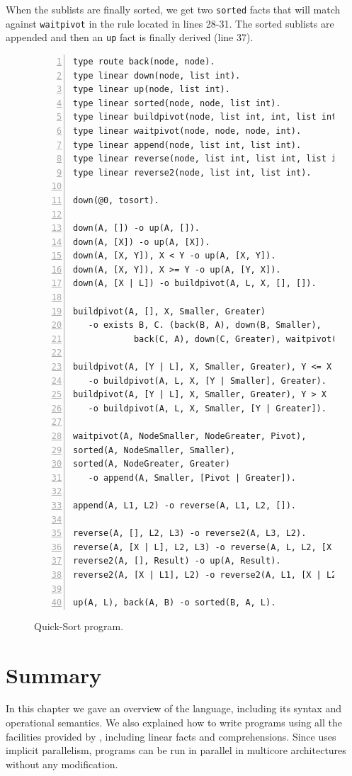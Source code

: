 When the sublists are finally sorted, we get two \texttt{sorted} facts that will match
against \texttt{waitpivot} in the rule located in lines 28-31. The sorted sublists
are appended and then an \texttt{up} fact is finally derived (line 37).

\begin{figure}[h!]
\small\begin{Verbatim}[numbers=left]
type route back(node, node).
type linear down(node, list int).
type linear up(node, list int).
type linear sorted(node, node, list int).
type linear buildpivot(node, list int, int, list int, list int).
type linear waitpivot(node, node, node, int).
type linear append(node, list int, list int).
type linear reverse(node, list int, list int, list int).
type linear reverse2(node, list int, list int).

down(@0, tosort).

down(A, []) -o up(A, []).
down(A, [X]) -o up(A, [X]).
down(A, [X, Y]), X < Y -o up(A, [X, Y]).
down(A, [X, Y]), X >= Y -o up(A, [Y, X]).
down(A, [X | L]) -o buildpivot(A, L, X, [], []).

buildpivot(A, [], X, Smaller, Greater)
   -o exists B, C. (back(B, A), down(B, Smaller),
            back(C, A), down(C, Greater), waitpivot(A, B, C, X)).

buildpivot(A, [Y | L], X, Smaller, Greater), Y <= X
   -o buildpivot(A, L, X, [Y | Smaller], Greater).
buildpivot(A, [Y | L], X, Smaller, Greater), Y > X
   -o buildpivot(A, L, X, Smaller, [Y | Greater]).
   
waitpivot(A, NodeSmaller, NodeGreater, Pivot),
sorted(A, NodeSmaller, Smaller),
sorted(A, NodeGreater, Greater)
   -o append(A, Smaller, [Pivot | Greater]).

append(A, L1, L2) -o reverse(A, L1, L2, []).

reverse(A, [], L2, L3) -o reverse2(A, L3, L2).
reverse(A, [X | L], L2, L3) -o reverse(A, L, L2, [X | L3]).
reverse2(A, [], Result) -o up(A, Result).
reverse2(A, [X | L1], L2) -o reverse2(A, L1, [X | L2]).

up(A, L), back(A, B) -o sorted(B, A, L).
\end{Verbatim}
  \caption{Quick-Sort program.}
  \label{code:quicksort}
\end{figure}
\normalsize


\section{Summary}

In this chapter we gave an overview of the \lang language, including its syntax and operational semantics.
We also explained how to write programs using all the facilities provided by \lang, including
linear facts and comprehensions. Since \lang uses implicit parallelism, programs can be run in parallel
in multicore architectures without any modification.
